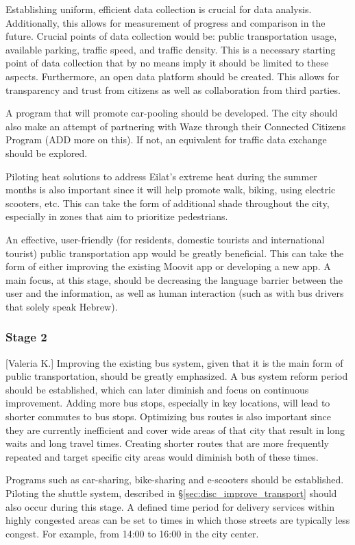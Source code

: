 \documentclass[12pt]{article}                               %
\begin{document}
Establishing uniform, efficient data collection is crucial for data analysis. Additionally, this allows for measurement of progress and comparison in the future. Crucial points of data collection would be: public transportation usage, available parking, traffic speed, and traffic density. This is a necessary starting point of data collection that by no means imply it should be limited to these aspects. Furthermore, an open data platform should be created. This allows for transparency and trust from citizens as well as collaboration from third parties. 

A program that will promote car-pooling should be developed. The city should also make an attempt of partnering with Waze through their Connected Citizens Program (ADD more on this). If not, an equivalent for traffic data exchange should be explored.

Piloting heat solutions to address Eilat's extreme heat during the summer months is also important since it will help promote walk, biking, using electric scooters, etc. This can take the form of additional shade throughout the city, especially in zones that aim to prioritize pedestrians. 

An effective, user-friendly (for residents, domestic tourists and international tourist) public transportation app would be greatly beneficial. This can take the form of either improving the existing Moovit app or developing a new app. A main focus, at this stage, should be decreasing the language barrier between the user and the information, as well as human interaction (such as with bus drivers that solely speak Hebrew).

\subsubsection{Stage 2}[Valeria K.]
Improving the existing bus system, given that it is the main form of public transportation, should be greatly emphasized. A bus system reform period should be established, which can later diminish and focus on continuous improvement. Adding more bus stops, especially in key locations, will lead to shorter commutes to bus stops. Optimizing bus routes is also important since they are currently inefficient and cover wide areas of that city that result in long waits and long travel times. Creating shorter routes that are more frequently repeated and target specific city areas would diminish both of these times. 

Programs such as car-sharing, bike-sharing and e-scooters should be established. Piloting the shuttle system, described in \S\ref{sec:disc_improve_transport} should also occur during this stage. A defined time period for delivery services within highly congested areas can be set to times in which those streets are typically less congest. For example, from 14:00 to 16:00 in the city center. 
\end{document}
